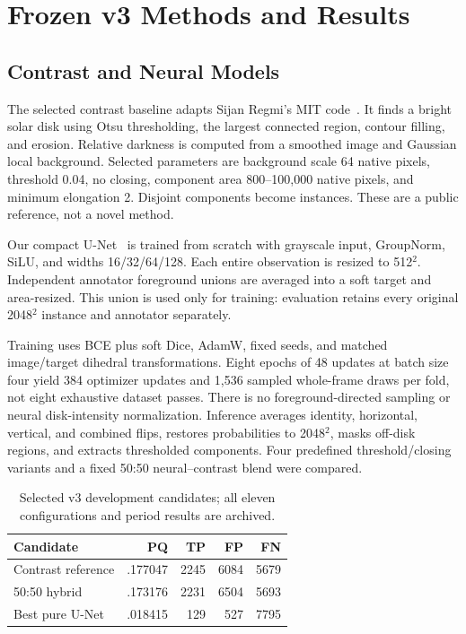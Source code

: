 \documentclass[sigconf]{acmart}
\begin{document}
\clearpage
\section{Frozen v3 Methods and Results}
\subsection{Contrast and Neural Models}
The selected contrast baseline adapts Sijan Regmi's MIT code~\cite{regmi}. It finds a bright solar disk using Otsu thresholding, the largest connected region, contour filling, and erosion. Relative darkness is computed from a smoothed image and Gaussian local background. Selected parameters are background scale 64 native pixels, threshold 0.04, no closing, component area 800--100,000 native pixels, and minimum elongation 2. Disjoint components become instances. These are a public reference, not a novel method.

Our compact U-Net~\cite{unet} is trained from scratch with grayscale input, GroupNorm, SiLU, and widths 16/32/64/128. Each entire observation is resized to 512$^2$. Independent annotator foreground unions are averaged into a soft target and area-resized. This union is used only for training: evaluation retains every original 2048$^2$ instance and annotator separately.

Training uses BCE plus soft Dice, AdamW, fixed seeds, and matched image/target dihedral transformations. Eight epochs of 48 updates at batch size four yield 384 optimizer updates and 1,536 sampled whole-frame draws per fold, not eight exhaustive dataset passes. There is no foreground-directed sampling or neural disk-intensity normalization. Inference averages identity, horizontal, vertical, and combined flips, restores probabilities to 2048$^2$, masks off-disk regions, and extracts thresholded components. Four predefined threshold/closing variants and a fixed 50:50 neural--contrast blend were compared.

\begin{table}[t]
\caption{Selected v3 development candidates; all eleven configurations and period results are archived.}
\label{tab:v3}
\centering
\begin{tabular}{lrrrr}
\toprule
Candidate & PQ & TP & FP & FN\\
\midrule
Contrast reference & .177047 & 2245 & 6084 & 5679\\
50:50 hybrid & .173176 & 2231 & 6504 & 5693\\
Best pure U-Net & .018415 & 129 & 527 & 7795\\
\bottomrule
\end{tabular}
\end{table}
\end{document}
